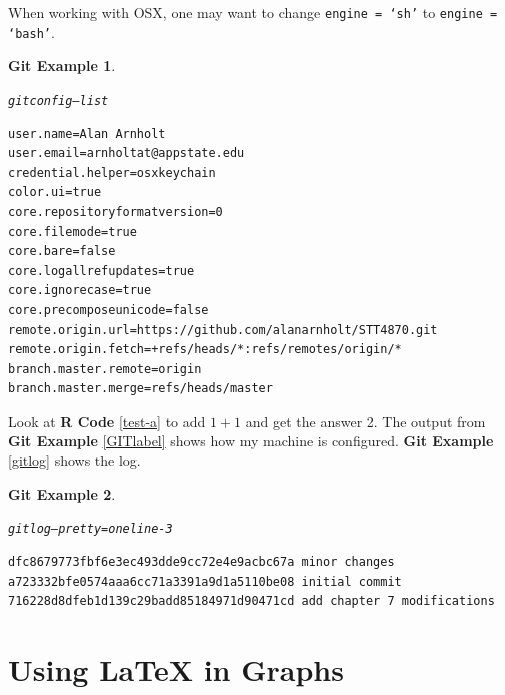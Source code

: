 \documentclass{article}\usepackage[]{graphicx}\usepackage[]{color}
\makeatletter
\newenvironment{kframe}{%
 \def\at@end@of@kframe{}%
 \ifinner\ifhmode%
  \def\at@end@of@kframe{\end{minipage}}%
  \begin{minipage}{\columnwidth}%
 \fi\fi%
 \def\FrameCommand##1{\hskip\@totalleftmargin \hskip-\fboxsep
 \colorbox{shadecolor}{##1}\hskip-\fboxsep
     \hskip-\linewidth \hskip-\@totalleftmargin \hskip\columnwidth}%
 \MakeFramed {\advance\hsize-\width
   \@totalleftmargin\z@ \linewidth\hsize
   \@setminipage}}%
 {\par\unskip\endMakeFramed%
 \at@end@of@kframe}
\newenvironment{knitrout}{}{} %
\theoremstyle{rcode}
\newtheorem{GIT}{Git Example}[section]
\makeatother
\begin{document}
When working with OSX, one may want to change \texttt{engine = `sh'} to \texttt{engine = `bash'}.

\begin{knitrout}
\color{fgcolor}\begin{kframe}
\begin{GIT}\label{GITlabel}\hfill{}\begin{alltt}
git config --list
\end{alltt}

\begin{verbatim}
user.name=Alan Arnholt
user.email=arnholtat@appstate.edu
credential.helper=osxkeychain
color.ui=true
core.repositoryformatversion=0
core.filemode=true
core.bare=false
core.logallrefupdates=true
core.ignorecase=true
core.precomposeunicode=false
remote.origin.url=https://github.com/alanarnholt/STT4870.git
remote.origin.fetch=+refs/heads/*:refs/remotes/origin/*
branch.master.remote=origin
branch.master.merge=refs/heads/master
\end{verbatim}
\end{GIT}\end{kframe}
\end{knitrout}


Look at \textbf{R Code} \vref{test-a} to add $1 + 1$ and get the answer 2. The output from \textbf{Git Example} \vref{GITlabel} shows how my machine is configured. \textbf{Git Example} \vref{gitlog} shows the log.

\begin{knitrout}
\color{fgcolor}\begin{kframe}
\begin{GIT}\label{gitlog}\hfill{}\begin{alltt}
git log --pretty=oneline -3
\end{alltt}

\begin{verbatim}
dfc8679773fbf6e3ec493dde9cc72e4e9acbc67a minor changes
a723332bfe0574aaa6cc71a3391a9d1a5110be08 initial commit
716228d8dfeb1d139c29badd85184971d90471cd add chapter 7 modifications
\end{verbatim}
\end{GIT}\end{kframe}
\end{knitrout}


\clearpage

\section{Using \LaTeX{} in Graphs}
\end{document}

